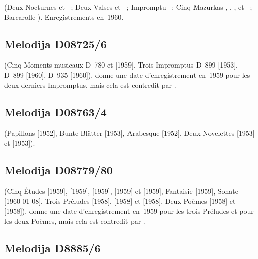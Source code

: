 \Chopin{} (Deux Nocturnes   et  ~;
Deux Valses   et  ~; Impromptu
~; Cinq Mazurkas  ,  ,
 ,   et  ~;
Barcarolle ).
Enregistrements en~1960.

\subsection{Melodija D08725/6}

\Schubert{} (Cinq Moments musicaux D~780  et  [1959],
Trois Impromptus D~899  [1953], D~899  [1960], D~935
 [1960]).
\INikonovich{} \citep[voir][p.~2]{Nikonovich11} donne une date
d'enregistrement en~1959 pour les deux derniers Impromptus, mais cela est
contredit par \FMalik{} \citep[voir][p.~70]{Malik}.

\subsection{Melodija D08763/4}

\Schumann{} (Papillons  [1952], Bunte Blätter 
 [1953], Arabesque  [1952], Deux Novelettes 
 [1953] et   [1953]).

\subsection{Melodija D08779/80}

\Scriabine{} (Cinq Études   [1959],  
[1959],   [1959],   [1959] et 
 [1959], Fantaisie  [1959], Sonate 
[1960-01-08], Trois Préludes   [1958], 
 [1958] et   [1958], Deux Poèmes 
 [1958] et   [1958]).
\INikonovich{} \citep[voir][p.~2]{Nikonovich11} donne une date
d'enregistrement en~1959 pour les trois Préludes et pour les deux Poèmes,
mais cela est contredit par \FMalik{} \citep[voir][p.~72 et p.~74]{Malik}.

\subsection{Melodija D8885/6}

